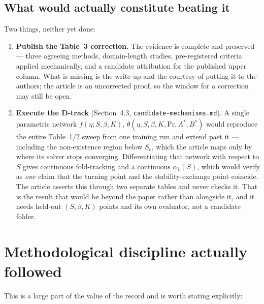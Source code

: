\documentclass[11pt,a4paper]{article}
\newcommand{\code}[1]{\texttt{\small #1}}
\begin{document}
\subsection{What would actually constitute beating it}
Two things, neither yet done:

\begin{enumerate}[leftmargin=1.4em,itemsep=2pt]
  \item \textbf{Publish the Table~3 correction.} The evidence is complete and preserved ---
        three agreeing methods, domain-length studies, pre-registered criteria applied
        mechanically, and a candidate attribution for the published upper column. What is
        missing is the write-up and the courtesy of putting it to the authors; the article
        is an uncorrected proof, so the window for a correction may still be open.
  \item \textbf{Execute the D-track} (Section~4.3, \code{candidate-mechanisms.md}). A single
        parametric network $f(\eta; S,\beta,K)$, $\theta(\eta; S,\beta,K,\mathrm{Pr},A^{*},B^{*})$
        would reproduce the entire Table~1/2 sweep from one training run and extend past it
        --- including the non-existence region below $S_c$, which the article maps only by
        where its solver stops converging. Differentiating that network with respect to $S$
        gives continuous fold-tracking and a continuous $\alpha_1(S)$, which would verify as
        \emph{one} claim that the turning point and the stability-exchange point coincide.
        The article asserts this through two separate tables and never checks it. That is
        the result that would be beyond the paper rather than alongside it, and it needs
        held-out $(S,\beta,K)$ points and its own evaluator, not a candidate folder.
\end{enumerate}

\section{Methodological discipline actually followed}

This is a large part of the value of the record and is worth stating explicitly:
\end{document}
